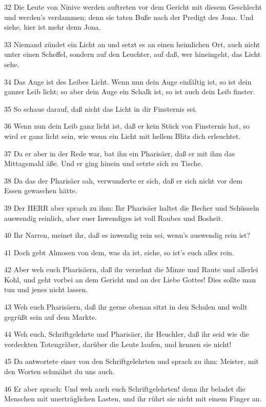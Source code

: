 \par 32 Die Leute von Ninive werden auftreten vor dem Gericht mit diesem Geschlecht und werden's verdammen; denn sie taten Buße nach der Predigt des Jona. Und siehe, hier ist mehr denn Jona.
\par 33 Niemand zündet ein Licht an und setzt es an einen heimlichen Ort, auch nicht unter einen Scheffel, sondern auf den Leuchter, auf daß, wer hineingeht, das Licht sehe.
\par 34 Das Auge ist des Leibes Licht. Wenn nun dein Auge einfältig ist, so ist dein ganzer Leib licht; so aber dein Auge ein Schalk ist, so ist auch dein Leib finster.
\par 35 So schaue darauf, daß nicht das Licht in dir Finsternis sei.
\par 36 Wenn nun dein Leib ganz licht ist, daß er kein Stück von Finsternis hat, so wird er ganz licht sein, wie wenn ein Licht mit hellem Blitz dich erleuchtet.
\par 37 Da er aber in der Rede war, bat ihn ein Pharisäer, daß er mit ihm das Mittagsmahl äße. Und er ging hinein und setzte sich zu Tische.
\par 38 Da das der Pharisäer sah, verwunderte er sich, daß er sich nicht vor dem Essen gewaschen hätte.
\par 39 Der HERR aber sprach zu ihm: Ihr Pharisäer haltet die Becher und Schüsseln auswendig reinlich, aber euer Inwendiges ist voll Raubes und Bosheit.
\par 40 Ihr Narren, meinet ihr, daß es inwendig rein sei, wenn's auswendig rein ist?
\par 41 Doch gebt Almosen von dem, was da ist, siehe, so ist's euch alles rein.
\par 42 Aber weh euch Pharisäern, daß ihr verzehnt die Minze und Raute und allerlei Kohl, und geht vorbei an dem Gericht und an der Liebe Gottes! Dies sollte man tun und jenes nicht lassen.
\par 43 Weh euch Pharisäern, daß ihr gerne obenan sitzt in den Schulen und wollt gegrüßt sein auf dem Markte.
\par 44 Weh euch, Schriftgelehrte und Pharisäer, ihr Heuchler, daß ihr seid wie die verdeckten Totengräber, darüber die Leute laufen, und kennen sie nicht!
\par 45 Da antwortete einer von den Schriftgelehrten und sprach zu ihm: Meister, mit den Worten schmähst du uns auch.
\par 46 Er aber sprach: Und weh auch euch Schriftgelehrten! denn ihr beladet die Menschen mit unerträglichen Lasten, und ihr rührt sie nicht mit einem Finger an.

